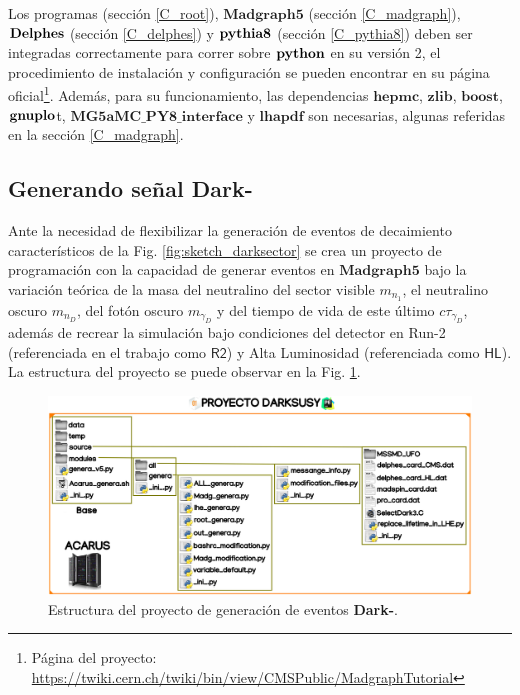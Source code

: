 Los programas \ROOT (sec\-ción \ref{C_root}), $\mathbf{Madgraph5}$ (sec\-ción \ref{C_madgraph}), $\mathbf{Del\-phes}$ (sec\-ción \-\ref{C_delphes}) y $\mathbf{py\-thia8}$ (sec\-ción \ref{C_pythia8}) de\-ben ser integradas correctamente para correr sobre $\mathbf{py\-thon}$ en su versión 2, el procedimiento de instalación y configuración se pueden encontrar en su página oficial\footnote{ Página del proyecto: \href{https://twiki.cern.ch/twiki/bin/view/CMSPublic/MadgraphTutorial}{https://twiki.cern.ch/twiki/bin/view/CMSPublic/MadgraphTutorial}}. %
Además, para su funcionamiento, las dependencias $\mathbf{hepmc}$, $\mathbf{zlib}$, $\mathbf{boost}$, $\mathbf{gnu}\-\mathbf{plo}$t, $\mathbf{MG5aMC\_PY8\_interface}$ y $\mathbf{lhapdf}$ son necesarias, algunas referidas en la sección \ref{C_madgraph}.


\subsection{Generando señal \textbf{Dark-}\SUSY}

Ante la necesidad de flexibilizar la generación de eventos de decaimiento característicos de la Fig. \ref{fig:sketch_darksector} se crea un proyecto de programación con la capacidad de generar eventos en $\mathbf{Madgraph5}$ bajo la variación teórica de la masa del neutralino del sector visible $m_{n_1}$, el neutralino oscuro $m_{n_D}$, del fotón oscuro $m_{\gamma_D}$ y del tiempo de vida de este último $c\tau_{\gamma_D}$, además de recrear la simulación bajo condiciones del detector en Run-2 (referenciada en el trabajo como $\textsf{R2}$) y Alta Luminosidad (referenciada como $\textsf{HL}$). La estructura del proyecto se puede observar en la Fig. \ref{genera_darksusy0}.

\begin{figure}[!ht]
\centering
\includegraphics[width=1\textwidth]{Cap3/imagenes/proyecto_darksusy.png}
\caption[Estructura del proyecto de generación de eventos \textbf{Dark-\SUSY}.]{Estructura del proyecto de generación de eventos \textbf{Dark-\SUSY}\footnotemark.}
\label{genera_darksusy0}
\end{figure}

